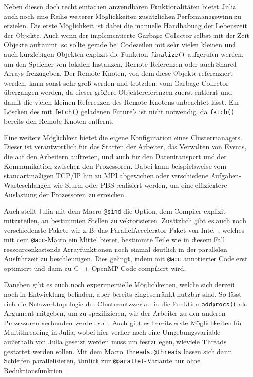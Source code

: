 \documentclass[proseminar,german,utf8]{zihpub}
\newcommand{\zB}[0]{{z.\,B. }}
\begin{document}
Neben diesen doch recht einfachen anwendbaren Funktionalitäten bietet Julia auch noch eine Reihe weiterer Möglichkeiten zusätzlichen Performanzgewinn zu erzielen. Die erste Möglichkeit ist dabei die manuelle Handhabung der Lebenszeit der Objekte. Auch wenn der implementierte Garbage-Collector selbst mit der Zeit Objekte aufräumt, so sollte gerade bei Codezeilen mit sehr vielen kleinen und auch kurzlebigen Objekten explizit die Funktion \verb|finalize()| aufgerufen werden, um den Speicher von lokalen Instanzen, Remote-Referenzen oder auch Shared Arrays freizugeben. Der Remote-Knoten, von dem diese Objekte referenziert werden, kann sonst sehr groß werden und trotzdem vom Garbage Collector übergangen werden, da dieser größere Objektereferenzen zuerst entfernt und damit die vielen kleinen Referenzen des Remote-Knotens unbeachtet lässt. Ein Löschen des mit \verb|fetch()| geladenen Future's ist nicht notwendig, da \verb|fetch()| bereits den Remote-Knoten entfernt. 

Eine weitere Möglichkeit bietet die eigene Konfiguration eines Clustermanagers. Dieser ist verantwortlich für das Starten der Arbeiter, das Verwalten von Events, die auf den Arbeitern auftreten, und auch für den Datentransport und der Kommunikation zwischen den Prozessoren. Dabei kann beispielsweise vom standartmäßigen TCP/IP hin zu MPI abgewichen oder verschiedene Aufgaben-Warteschlangen wie Slurm oder PBS realisiert werden, um eine effizientere Auslastung der Prozessoren zu erreichen. 

Auch stellt Julia mit dem Macro \verb|@simd| die Option, dem Compiler explizit mitzuteilen, an bestimmten Stellen zu vektorisieren. Zusätzlich gibt es auch noch verschiedenste Pakete wie \zB das ParallelAccelerator-Paket von Intel~\cite{JuliaLangParallelAccelerator}, welches mit dem \verb|@acc|-Macro ein Mittel bietet, bestimmte Teile wie in diesem Fall ressourcenkostende Arrayfunktionen noch einmal deutlich in der parallelen Ausführzeit zu beschleunigen. Dies gelingt, indem mit  \verb|@acc| annotierter Code erst optimiert und dann zu C++ OpenMP Code compiliert wird. 

Daneben gibt es auch noch experimentielle Möglichkeiten, welche sich derzeit noch in Entwicklung befinden, aber bereits eingeschränkt nutzbar sind. So lässt sich die Netzwerktopologie des Clusternetzwerkes in die Funktion \verb|addprocs()| als Argument mitgeben, um zu spezifizieren, wie der Arbeiter zu den anderen Prozessoren verbunden werden soll. Auch gibt es bereits erste Möglichkeiten für Multithreading in Julia, wobei hier vorher noch eine Umgebungsvariable außerhalb von Julia gesetzt werden muss um festzulegen, wieviele Threads gestartet werden sollen. Mit dem Macro \verb|Threads.@threads| lassen sich dann Schleifen parallelisieren, ähnlich zur \verb|@parallel|-Variante nur ohne Reduktionsfunktion~\cite{JuliaLangDocumentation}.
\end{document}
